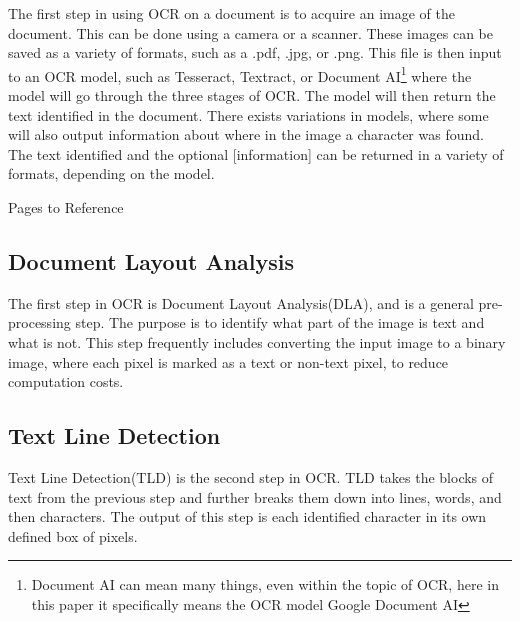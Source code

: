 \documentclass[sigplan,screen,nonacm]{acmart-tagged}
\begin{document}
The first step in using OCR on a document is to acquire an image of the document. This can be done using a camera or a scanner. These images can be saved as a variety of formats, such as a .pdf, .jpg, or .png. This file is then input to an OCR model, such as Tesseract, Textract, or Document AI\footnote{Document AI can mean many things, even within the topic of OCR, here in this paper it specifically means the OCR model Google Document AI} where the model will go through the three stages of OCR. The model will then return the text identified in the document. There exists variations in models, where some will also output information about where in the image a character was found. The text identified and the optional [information] can be returned in a variety of formats, depending on the model.

Pages to Reference\cite{Raj:2022,Avyodri:2022,Thorat:2022}

\subsection{Document Layout Analysis}
\label{DLA}

The first step in OCR is Document Layout Analysis(DLA), and is a general pre-processing step. The purpose is to identify what part of the image is text and what is not. 
This step frequently includes converting the input image to a binary image, where each pixel is marked as a text or non-text pixel, to reduce computation costs.

\subsection{Text Line Detection}
\label{TLD}

Text Line Detection(TLD) is the second step in OCR. TLD takes the blocks of text from the previous step and further breaks them down into lines, words, and then characters. The output of this step is each identified character in its own defined box of pixels.


\end{document}
